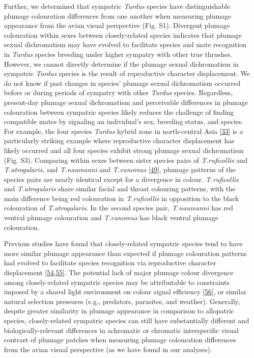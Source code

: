 \documentclass[
  a4paper,
]{article}
\begin{document}
Further, we determined that sympatric \emph{Turdus} species have
distinguishable plumage colouration differences from one another when
measuring plumage appearance from the avian visual perspective (Fig.
S1). Divergent plumage colouration within sexes between closely-related
species indicates that plumage sexual dichromatism may have evolved to
facilitate species and mate recognition in \emph{Turdus} species
breeding under higher sympatry with other true thrushes. However, we
cannot directly determine if the plumage sexual dichromatism in
sympatric \emph{Turdus} species is the result of reproductive character
displacement. We do not know if past changes in species' plumage sexual
dichromatism occurred before or during periods of sympatry with other
\emph{Turdus} species. Regardless, present-day plumage sexual
dichromatism and perceivable differences in plumage colouration between
sympatric species likely reduces the challenge of finding compatible
mates by signaling an individual's sex, breeding status, and species.
For example, the four species \emph{Turdus} hybrid zone in north-central
Asia {[}\protect\hyperlink{ref-mccarthy2006}{33}{]} is a particularly
striking example where reproductive character displacement has likely
occurred and all four species exhibit strong plumage sexual dichromatism
(Fig. S3). Comparing within sexes between sister species pairs of
\emph{T.ruficollis} and \emph{T.atrogularis}, and \emph{T.naumanni} and
\emph{T.eunomus} {[}\protect\hyperlink{ref-nylander2008}{49}{]}, plumage
patterns of the species pairs are nearly identical except for a
divergence in colour. \emph{T.ruficollis} and \emph{T.atrogularis} share
similar facial and throat colouring patterns, with the main difference
being red colouration in \emph{T.ruficollis} in opposition to the black
colouration of \emph{T.atrogularis}. In the second species pair,
\emph{T.naumanni} has red ventral plumage colouration and
\emph{T.eunomus} has black ventral plumage colouration.

Previous studies have found that closely-related sympatric species tend
to have more similar plumage appearance than expected if plumage
colouration patterns had evolved to facilitate species recognition via
reproductive character displacement
{[}\protect\hyperlink{ref-simpson2021}{54},\protect\hyperlink{ref-miller2019}{55}{]}.
The potential lack of major plumage colour divergence among
closely-related sympatric species may be attributable to constraints
imposed by a shared light environment on colour signal efficiency
{[}\protect\hyperlink{ref-mcnaught2002}{56}{]}, or similar natural
selection pressures (e.g., predators, parasites, and weather).
Generally, despite greater similarity in plumage appearance in
comparison to allopatric species, closely-related sympatric species can
still have substantially different and biologically-relevant differences
in achromatic or chromatic interspecific visual contrast of plumage
patches when measuring plumage colouration differences from the avian
visual perspective (as we have found in our analyses).
\end{document}
